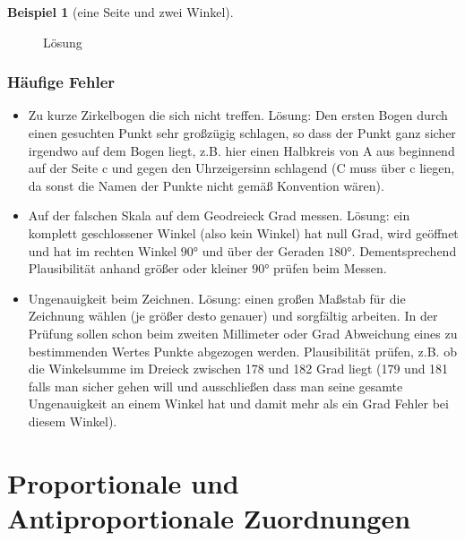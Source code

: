 \documentclass[a4paper]{book}%
\theoremstyle{definition}
\newtheorem{beispiel}{Beispiel}
\begin{document}
\begin{beispiel}[eine Seite und zwei Winkel]
\begin{figure}
  \caption{Lösung}\label{fig:DreieckSeiteUndBeideDaranLiegendenWinkel2}
\end{figure}

\end{beispiel}


\subsection{Häufige Fehler}
\begin{itemize}
  \item Zu kurze Zirkelbogen die sich nicht treffen. Lösung: Den ersten Bogen durch einen gesuchten Punkt sehr großzügig schlagen, so dass der Punkt ganz sicher irgendwo auf dem Bogen liegt, z.B. hier einen Halbkreis von A aus beginnend auf der Seite c und gegen den Uhrzeigersinn schlagend (C muss über c liegen, da sonst die Namen der Punkte nicht gemäß Konvention wären).
  \item Auf der falschen Skala auf dem Geodreieck Grad messen. Lösung: ein komplett geschlossener Winkel (also kein Winkel) hat null Grad, wird geöffnet und hat im rechten Winkel $90°$ und über der Geraden $180°$. Dementsprechend Plausibilität anhand größer oder kleiner $90°$ prüfen beim Messen.
  \item Ungenauigkeit beim Zeichnen. Lösung: einen großen Maßstab für die Zeichnung wählen (je größer desto genauer) und sorgfältig arbeiten. In der Prüfung sollen schon beim zweiten Millimeter oder Grad Abweichung eines zu bestimmenden Wertes Punkte abgezogen werden. Plausibilität prüfen, z.B. ob die Winkelsumme im Dreieck zwischen 178 und 182 Grad liegt (179 und 181 falls man sicher gehen will und ausschließen dass man seine gesamte Ungenauigkeit an einem Winkel hat und damit mehr als ein Grad Fehler bei diesem Winkel).
\end{itemize}


\chapter{Proportionale und Antiproportionale Zuordnungen}
\end{document}

